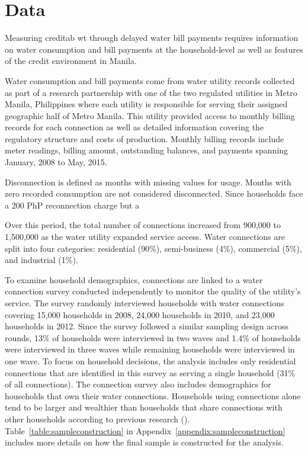 \documentclass[12pt]{article}
\begin{document}
\section{Data}\label{section:data}


Measuring creditab wt through delayed water bill payments requires information on water consumption and bill payments at the household-level as well as features of the credit environment in Manila.  %

Water consumption and bill payments come from water utility records collected as part of a research partnership with one of the two regulated utilities in Metro Manila, Philippines where each utility is responsible for serving their assigned geographic half of Metro Manila.  This utility provided access to monthly billing records for each connection as well as detailed information covering the regulatory structure and costs of production.  Monthly billing records include meter readings, billing amount, outstanding balances, and payments spanning January, 2008 to May, 2015. 

Disconnection is defined as months with missing values for usage.  Months with zero recorded consumption are not considered disconnected.  Since households face a 200 PhP reconnection charge but a 


Over this period, the total number of connections increased from 900,000 to 1,500,000 as the water utility expanded service access.  Water connections are split into four categories: residential (90\%), semi-business (4\%), commercial (5\%), and industrial (1\%).  

To examine household demographics, connections are linked to a water connection survey conducted independently to monitor the quality of the utility's service.  The survey randomly interviewed households with water connections covering 15,000 households in 2008, 24,000 households in 2010, and 23,000 households in 2012.  Since the survey followed a similar sampling design across rounds, 13\% of households were interviewed in two waves and 1.4\% of households were interviewed in three waves while remaining households were interviewed in one wave.  To focus on household decisions, the analysis includes only residential connections that are identified in this survey as serving a single household (31\% of all connections).  The connection survey also includes demographics for households that own their water connections.  Households using connections alone tend to be larger and wealthier than households that share connections with other households according to previous research (\cite{wjv}).  Table~\ref{table:sampleconstruction} in Appendix~\ref{appendix:sampleconstruction} includes more details on how the final sample is constructed for the analysis.
\end{document}
